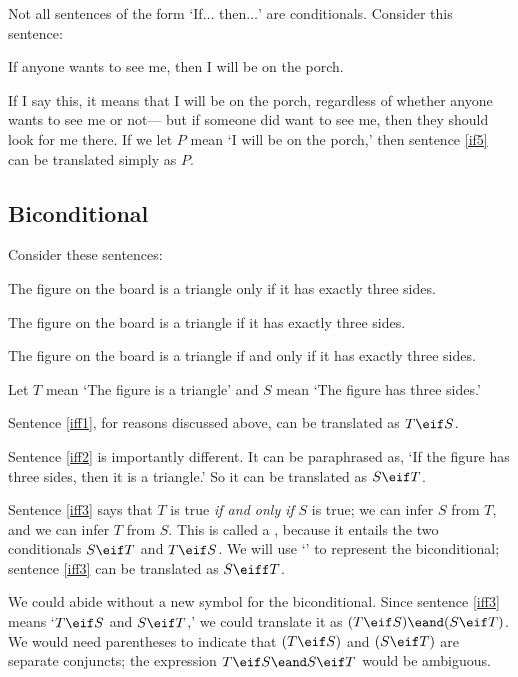 Not all sentences of the form `If$\ldots$ then$\ldots$' are conditionals. Consider this sentence:

\begin{earg}
\item[\ex{if5}] If anyone wants to see me, then I will be on the porch.
\end{earg}

If I say this, it means that I will be on the porch, regardless of whether anyone wants to see me or not--- but if someone did want to see me, then they should look for me there. If we let $P$ mean `I will be on the porch,' then sentence \ref{if5} can be translated simply as $P$.


\subsection{Biconditional}
Consider these sentences:
\begin{earg}
\item[\ex{iff1}] The figure on the board is a triangle only if it has exactly three sides.
\item[\ex{iff2}] The figure on the board is a triangle if it has exactly three sides.
\item[\ex{iff3}] The figure on the board is a triangle if and only if it has exactly three sides.
\end{earg}

Let $T$ mean `The figure is a triangle' and $S$ mean `The figure has three sides.'

Sentence \ref{iff1}, for reasons discussed above, can be translated as $T\eif S$.

Sentence \ref{iff2} is importantly different. It can be paraphrased as, `If the figure has three sides, then it is a triangle.' So it can be translated as $S\eif T$.

Sentence \ref{iff3} says that $T$ is true \emph{if and only if} $S$ is true; we can infer $S$ from $T$, and we can infer $T$ from $S$. This is called a , because it entails the two conditionals $S\eif T$ and $T \eif S$. We will use `\eiff' to represent the biconditional; sentence \ref{iff3} can be translated as $S \eiff T$.

We could abide without a new symbol for the biconditional. Since sentence \ref{iff3} means `$T \eif S$ and $S\eif T$,' we could translate it as $(T \eif S)\eand(S\eif T)$. We would need parentheses to indicate that $(T \eif S)$ and $(S\eif T)$ are separate conjuncts; the expression $T \eif S\eand S\eif T$ would be ambiguous.

